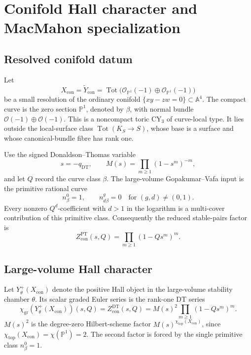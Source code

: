 \providecommand{\CY}{\mathrm{CY}}
\providecommand{\kch}{\kappa_{\mathrm{ch}}}
\providecommand{\DT}{\mathrm{DT}}
\providecommand{\PT}{\mathrm{PT}}
\providecommand{\NCDT}{\mathrm{NCDT}}
\providecommand{\Ytil}{\widetilde Y}
\providecommand{\Yplus}{Y^{+}}
\providecommand{\MacM}{M}
\providecommand{\chtop}{\chi_{\mathrm{top}}}
\providecommand{\CoHA}{\mathrm{CoHA}}
\providecommand{\Jac}{\mathrm{Jac}}
\providecommand{\bP}{\mathbb{P}}
\providecommand{\C}{\mathbb{C}}
\providecommand{\gr}{\mathrm{gr}}

\section*{Conifold Hall character and MacMahon specialization}

\subsection*{Resolved conifold datum}

Let
\[
  X_{\mathrm{con}}
  =
  \Ytil_{\mathrm{con}}
  =
  \operatorname{Tot}\bigl(\mathcal O_{\bP^1}(-1)
  \oplus \mathcal O_{\bP^1}(-1)\bigr)
\]
be a small resolution of the ordinary conifold
\(\{xy-zw=0\}\subset \mathbb A^4\).  The compact curve is the zero
section \(\bP^1\), denoted by \(\beta\), with normal bundle
\(\mathcal O(-1)\oplus\mathcal O(-1)\).  This is a noncompact toric
\(\CY_3\) of curve-local type.  It lies outside the local-surface class
\(\operatorname{Tot}(K_S\to S)\), whose base is a surface and whose
canonical-bundle fibre has rank one.

Use the signed Donaldson--Thomas variable
\[
  s=-q_{\DT}, \qquad
  \MacM(s)=\prod_{m\geq 1}(1-s^m)^{-m},
\]
and let \(Q\) record the curve class \(\beta\).  The large-volume
Gopakumar--Vafa input is the primitive rational curve
\[
  n^0_{\beta}=1,\qquad
  n^g_{d\beta}=0 \quad\text{for }(g,d)\ne(0,1).
\]
Every nonzero \(Q^d\)-coefficient with \(d>1\) in the logarithm is a
multi-cover contribution of this primitive class.  Consequently the
reduced stable-pairs factor is
\[
  Z^{\PT}_{\mathrm{con}}(s,Q)
  =
  \prod_{m\geq 1}(1-Qs^m)^m .
\]

\subsection*{Large-volume Hall character}

Let \(\Yplus_{\theta}(X_{\mathrm{con}})\) denote the positive Hall object
in the large-volume stability chamber \(\theta\).  Its scalar graded
Euler series is the rank-one DT series
\[
  \chi_{\gr}\!\left(\Yplus_{\theta}(X_{\mathrm{con}})\right)(s,Q)
  =
  Z^{\DT}_{\mathrm{con}}(s,Q)
  =
  \MacM(s)^2 \prod_{m\geq 1}(1-Qs^m)^m .
  \tag{1}
\]
\(\MacM(s)^2\) is the degree-zero Hilbert-scheme factor
\(\MacM(s)^{\chtop(X_{\mathrm{con}})}\), since
\(\chtop(X_{\mathrm{con}})=\chi(\bP^1)=2\).  The second factor is forced
by the single primitive class \(n^0_{\beta}=1\).

